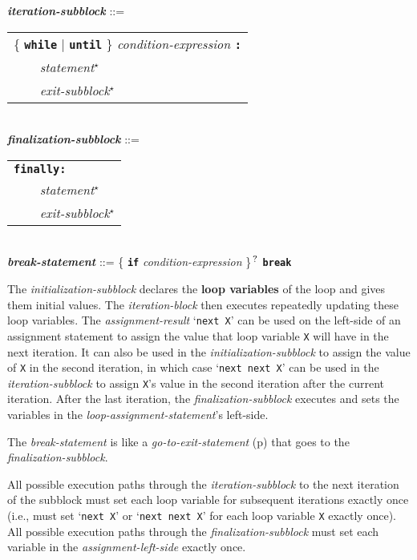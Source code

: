 \documentclass[12pt]{article}
\newcommand{\TT}[1]{{\tt \bfseries #1}}
\newcommand{\STAR}{{\Large $^\star$}}
\newcommand{\QMARK}{{$^{\,\mbox{\footnotesize ?}}$}}
\newcommand{\ttkey}[1]{{\tt \bfseries #1}}
\newcommand{\emkey}[1]{{\em \bfseries #1}}
\newcommand{\skey}[2]{{\rm \bfseries #1#2}}
\newcommand{\pagref}[1]{p\pageref{#1}}
\newenvironment{indpar}[1][0.3in]%
	{\begin{list}{}%
		     {\setlength{\itemsep}{0in}%
		      \setlength{\topsep}{0in}%
		      \setlength{\parsep}{1ex}%
		      \setlength{\labelwidth}{#1}%
		      \setlength{\leftmargin}{#1}%
		      \addtolength{\leftmargin}{\labelsep}}%
	 \item}%
	{\end{list}}
\begin{document}
\begin{indpar}
\emkey{iteration-subblock} ::= \\
\hspace*{0.5in}\begin{tabular}[t]{l}
        \{ \ttkey{while} $|$ \ttkey{until} \}
	    {\em condition-expression} \TT{:} \\
	\TT{~~~~}{\em statement}\STAR{} \\
	\TT{~~~~}{\em exit-subblock}\STAR{} \\
	\end{tabular}
\\[0.5ex]
\emkey{finalization-subblock} ::= \\
\hspace*{0.5in}\begin{tabular}[t]{l}
        \ttkey{finally}\TT{:} \\
	\TT{~~~~}{\em statement}\STAR{} \\
	\TT{~~~~}{\em exit-subblock}\STAR{} \\
	\end{tabular}
\\[0.5ex]
\emkey{break-statement}\label{BREAK-STATEMENT} ::=
    \{ \TT{if} {\em condition-expression} \}\QMARK{} \ttkey{break}
\end{indpar}

The {\em initialization-subblock} declares the \skey{loop variable}s
of the loop and gives them initial values.  The {\em iteration-block}
then executes repeatedly updating these loop variables.  The
{\em assignment-result} `{\tt next X}' can be used on the left-side of
an assignment statement to assign the value that loop variable
{\tt X} will have in the next iteration.
It can also be used in the {\em initialization-subblock}
to assign the value of {\tt X} in the second iteration, in which case
`{\tt next next X}' can be used in the {\em iteration-subblock}
to assign {\tt X}'s value in the second iteration after the current
iteration.  After the last iteration, the {\em finalization-subblock}
executes and sets the variables in the {\em loop-assignment-statement}'s
left-side.

The {\em break-statement} is like a
{\em go-to-exit-statement} (\pagref{GO-TO-STATEMENT}) that
goes to the {\em finalization-subblock}.

All possible execution paths through the {\em iteration-subblock}
to the next iteration of the subblock
must set each loop variable for subsequent iterations exactly once
(i.e., must set `{\tt next X}' or `{\tt next next X}' for each
loop variable {\tt X} exactly once).
All possible execution paths through the
{\em finalization-subblock} must set each variable
in the {\em assignment-left-side} exactly once.
\end{document}
